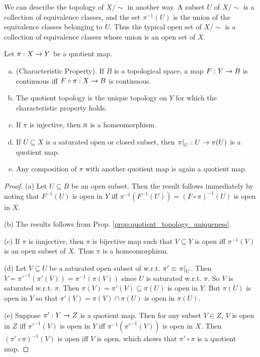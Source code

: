 \documentclass[11pt,a4paper]{article}
\begin{document}
\begin{remark}
We can describe the topology of $X/\sim$ in another way. A subset $U$ of $X/\sim$ is a collection of equivalence classes, and the set $\pi^{-1}(U)$ is the union of the equivalence classes belonging to $U$. Thus the typical open set of $X/\sim$ is a collection of equivalence classes whose union is an open set of $X$.
\end{remark}

\begin{proposition} \label{prop:quotient_map_properties}
Let $\pi:X\rightarrow Y$ be a quotient map.
\begin{enumerate}[(a)]
    \item (Characteristic Property). If $B$ is a topological space, a map $F:Y\rightarrow B$ is continuous iff $F\circ \pi:X\rightarrow B$ is continuous.
    \item The quotient topology is the unique topology on $Y$ for which the characteristic property holds.
    \item If $\pi$ is injective, then it is a homeomorphism.
    \item If $U\subseteq X$ is a saturated open or closed subset, then $\left.\pi\right|_{U}:U\rightarrow \pi(U)$ is a quotient map.
    \item Any composition of $\pi$ with another quotient map is again a quotient map.
\end{enumerate}
\end{proposition}

\begin{proof}
(a) Let $U\subseteq B$ be an open subset. Then the result follows immediately by noting that $F^{-1}(U)$ is open in $Y$ iff $\pi^{-1}(F^{-1}(U)) = (F\circ \pi)^{-1}(U)$ is open in $X$.

\noindent(b) The results follows from Prop. \ref{prop:quotient_topology_uniqueness}.

\noindent(c) If $\pi$ is innjective, then $\pi$ is bijective map such that $V\subseteq Y$ is open iff $\pi^{-1}(V)$ is an open subset of $X$. Thus $\pi$ is a homeomorphism.

\noindent(d) Let $V\subseteq U$ be a saturated open subset of w.r.t. $\pi'\equiv \left.\pi\right|_{U}$. Then $V = \pi'^{-1}(\pi'(V)) = \pi^{-1}(\pi(V))$ since $U$ is saturated w.r.t. $\pi$. So $V$ is saturated w.r.t. $\pi$. Then $\pi(V) = \pi'(V)\subseteq \pi(U)$ is open in $Y$. But $\pi(U)$ is open in $Y$ so that $\pi'(V) = \pi(V)\cap \pi(U)$ is open in $\pi(U)$.

\noindent(e) Suppose $\pi':Y\rightarrow Z$ is a quotient map. Then for any subset $V\in Z$, $V$ is open in $Z$ iff $\pi'^{-1}(V)$ is open in $Y$ iff $\pi^{-1}(\pi'^{-1}(V))$ is open in $X$. Then $(\pi'\circ\pi)^{-1}(V)$ is open iff $V$ is open, which shows that $\pi'\circ \pi$ is a quotient map.
\end{proof}
\end{document}
